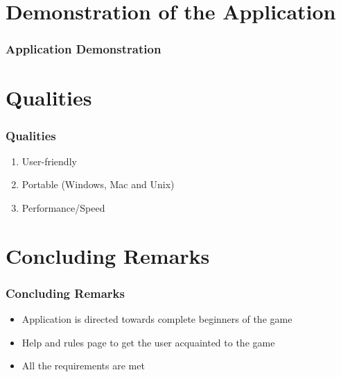 \documentclass{beamer}
\begin{document}
\section[Demonstration]{Demonstration of the Application}


\begin{frame}

\frametitle{Application Demonstration}

\end{frame}


\section[Qualities]{Qualities}


\begin{frame}

\frametitle{Qualities}

\begin{enumerate}
\item User-friendly
\item Portable (Windows, Mac and Unix)
\item Performance/Speed
\end{enumerate}

\end{frame}


\section[Conclusions]{Concluding Remarks}


\begin{frame}

\frametitle{Concluding Remarks}

\begin{itemize}

\item Application is directed towards complete beginners of the game
\item Help and rules page to get the user acquainted to the game
\item All the requirements are met

\end{itemize}

\end{frame}

\end{document}
